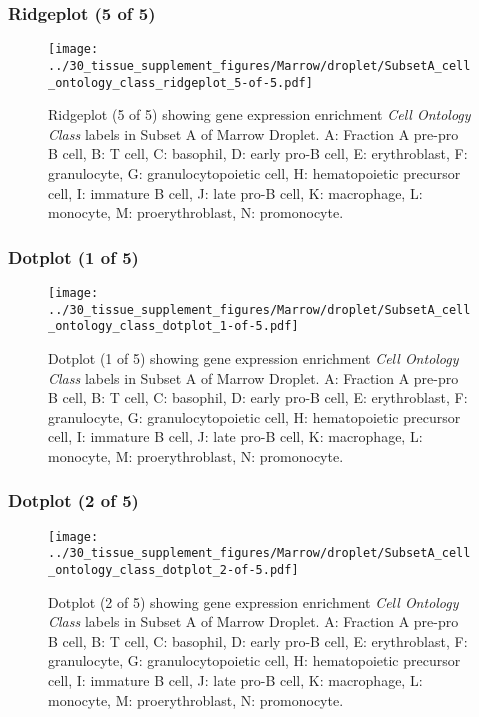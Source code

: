 \clearpage

\subsubsection{Ridgeplot (5 of 5)}
\begin{figure}[h]
\centering
\texttt{[image: ../30\_tissue\_supplement\_figures/Marrow/droplet/SubsetA\_cell\_ontology\_class\_ridgeplot\_5-of-5.pdf]}

\caption{ Ridgeplot (5 of 5)  showing gene expression enrichment \emph{Cell Ontology Class} labels in Subset A of Marrow Droplet. A: Fraction A pre-pro B cell, B: T cell, C: basophil, D: early pro-B cell, E: erythroblast, F: granulocyte, G: granulocytopoietic cell, H: hematopoietic precursor cell, I: immature B cell, J: late pro-B cell, K: macrophage, L: monocyte, M: proerythroblast, N: promonocyte.}
\end{figure}


\clearpage

\subsubsection{Dotplot (1 of 5)}
\begin{figure}[h]
\centering
\texttt{[image: ../30\_tissue\_supplement\_figures/Marrow/droplet/SubsetA\_cell\_ontology\_class\_dotplot\_1-of-5.pdf]}

\caption{ Dotplot (1 of 5)  showing gene expression enrichment \emph{Cell Ontology Class} labels in Subset A of Marrow Droplet. A: Fraction A pre-pro B cell, B: T cell, C: basophil, D: early pro-B cell, E: erythroblast, F: granulocyte, G: granulocytopoietic cell, H: hematopoietic precursor cell, I: immature B cell, J: late pro-B cell, K: macrophage, L: monocyte, M: proerythroblast, N: promonocyte.}
\end{figure}


\clearpage

\subsubsection{Dotplot (2 of 5)}
\begin{figure}[h]
\centering
\texttt{[image: ../30\_tissue\_supplement\_figures/Marrow/droplet/SubsetA\_cell\_ontology\_class\_dotplot\_2-of-5.pdf]}

\caption{ Dotplot (2 of 5)  showing gene expression enrichment \emph{Cell Ontology Class} labels in Subset A of Marrow Droplet. A: Fraction A pre-pro B cell, B: T cell, C: basophil, D: early pro-B cell, E: erythroblast, F: granulocyte, G: granulocytopoietic cell, H: hematopoietic precursor cell, I: immature B cell, J: late pro-B cell, K: macrophage, L: monocyte, M: proerythroblast, N: promonocyte.}
\end{figure}


